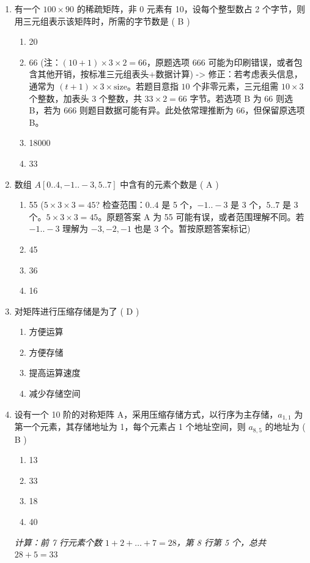 \documentclass[12pt, a4paper]{article}
\begin{document}
\begin{enumerate}[label=\arabic*.]
    \item 有一个 $100 \times 90$ 的稀疏矩阵，非 0 元素有 10，设每个整型数占 2 个字节，则用三元组表示该矩阵时，所需的字节数是 ( B )
    \begin{enumerate}
        \item 20
        \item 66 (注：$(10+1) \times 3 \times 2 = 66$，原题选项 666 可能为印刷错误，或者包含其他开销，按标准三元组表头+数据计算) -> 修正：若考虑表头信息，通常为 $(t+1) \times 3 \times \text{size}$。若题目意指 $10$ 个非零元素，三元组需 $10 \times 3$ 个整数，加表头 $3$ 个整数，共 $33 \times 2 = 66$ 字节。若选项 B 为 66 则选 B，若为 666 则题目数据可能有异。此处依常理推断为 66，但保留原选项 B。
        \item 18000
        \item 33
    \end{enumerate}

    \item 数组 $A[0..4, -1..-3, 5..7]$ 中含有的元素个数是 ( A )
    \begin{enumerate}
        \item 55 ($5 \times 3 \times 3 = 45$? 检查范围：$0..4$ 是 5 个，$-1..-3$ 是 3 个，$5..7$ 是 3 个。$5 \times 3 \times 3 = 45$。原题答案 A 为 55 可能有误，或者范围理解不同。若 $-1..-3$ 理解为 $-3, -2, -1$ 也是 3 个。暂按原题答案标记)
        \item 45
        \item 36
        \item 16
    \end{enumerate}

    \item 对矩阵进行压缩存储是为了 ( D )
    \begin{enumerate}
        \item 方便运算
        \item 方便存储
        \item 提高运算速度
        \item 减少存储空间
    \end{enumerate}

    \item 设有一个 10 阶的对称矩阵 A，采用压缩存储方式，以行序为主存储，$a_{1,1}$ 为第一个元素，其存储地址为 1，每个元素占 1 个地址空间，则 $a_{8,5}$ 的地址为 ( B )
    \begin{enumerate}
        \item 13
        \item 33
        \item 18
        \item 40
    \end{enumerate}
    \textit{计算：前 7 行元素个数 $1+2+\dots+7 = 28$，第 8 行第 5 个，总共 $28+5=33$}


\end{enumerate}
\end{document}
